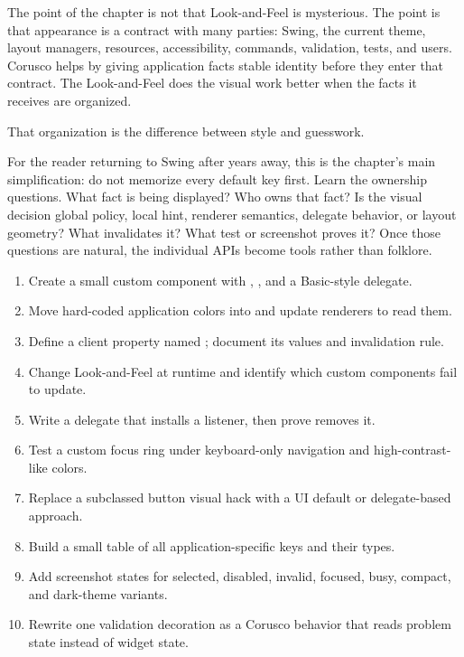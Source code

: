 The point of the chapter is not that Look-and-Feel is mysterious. The point is that appearance is a contract with many parties: Swing, the current theme, layout managers, resources, accessibility, commands, validation, tests, and users. Corusco helps by giving application facts stable identity before they enter that contract. The Look-and-Feel does the visual work better when the facts it receives are organized.

That organization is the difference between style and guesswork.

For the reader returning to Swing after years away, this is the chapter's main simplification: do not memorize every default key first. Learn the ownership questions. What fact is being displayed? Who owns that fact? Is the visual decision global policy, local hint, renderer semantics, delegate behavior, or layout geometry? What invalidates it? What test or screenshot proves it? Once those questions are natural, the individual APIs become tools rather than folklore.

\begin{exercisebox}
\begin{enumerate}
\item Create a small custom component with , , and a Basic-style delegate.
\item Move hard-coded application colors into  and update renderers to read them.
\item Define a client property named ; document its values and invalidation rule.
\item Change Look-and-Feel at runtime and identify which custom components fail to update.
\item Write a delegate that installs a listener, then prove  removes it.
\item Test a custom focus ring under keyboard-only navigation and high-contrast-like colors.
\item Replace a subclassed button visual hack with a UI default or delegate-based approach.
\item Build a small table of all application-specific  keys and their types.
\item Add screenshot states for selected, disabled, invalid, focused, busy, compact, and dark-theme variants.
\item Rewrite one validation decoration as a Corusco behavior that reads problem state instead of widget state.
\end{enumerate}
\end{exercisebox}

